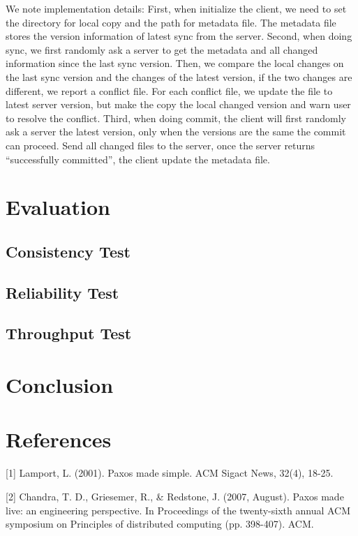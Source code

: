 \documentclass[11pt]{article}
\begin{document}
We note implementation details: First, when initialize the client, we need to set the directory for local copy and the path for metadata file. The metadata file stores the version information of latest sync from the server. Second, when doing sync, we first randomly ask a server to get the metadata and all changed information since the last sync version. Then, we compare the local changes on the last sync version and the changes of the latest version, if the two changes are different, we report a conflict file. For each conflict file, we update the file to latest server version, but make the copy the local changed version and warn user to resolve the conflict. Third, when doing commit, the client will first randomly ask a server the latest version, only when the versions are the same the commit can proceed. Send all changed files to the server, once the server returns ``successfully committed'', the client update the metadata file.

\section{Evaluation}
\label{sec:eval}
\subsection{Consistency Test}
\subsection{Reliability Test}
\subsection{Throughput Test}

\section{Conclusion}
\label{sec:conclusion}


\section{References}

[1] Lamport, L. (2001). Paxos made simple. ACM Sigact News, 32(4), 18-25.

[2] Chandra, T. D., Griesemer, R., \& Redstone, J. (2007, August). Paxos made live: an engineering perspective. In Proceedings of the twenty-sixth annual ACM symposium on Principles of distributed computing (pp. 398-407). ACM.
\end{document}
